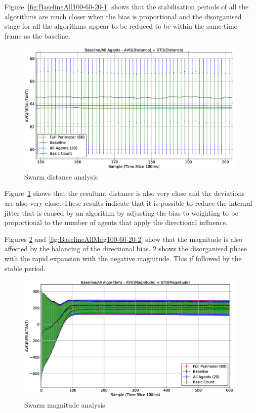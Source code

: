 Figure~\ref{fig:BaselineAll100-60-20-1} shows that the stabilisation periods of all the algorithms are much closer when the bias is proportional and the disorganised stage for all the algorithms appear to be reduced to be within the same time frame as the baseline.

\begin{figure}[H]
\begin{center}
\includegraphics[width=14cm]{CHAPTER-6/figures/BaselineAll100-60-20-2}
\end{center}
\caption{Swarm distance analysis\label{fig:BaselineAll100-60-20-2}}
\end{figure}

Figure~\ref{fig:BaselineAll100-60-20-2} shows that the resultant distance is also very close and the deviations are also very close. These results indicate that it is possible to reduce the internal jitter that is caused by an algorithm by adjusting the bias to weighting to be proportional to the number of agents that apply the directional influence.

Figures \ref{fig:BaselineAllMag100-60-20-1} and \ref{fig:BaselineAllMag100-60-20-2} show that the magnitude is also affected by the balancing of the directional bias. \ref{fig:BaselineAllMag100-60-20-1} shows the disorganised phase with the rapid expansion with the negative magnitude. This if followed by the stable period. 

\begin{figure}[H]
\begin{center}
\includegraphics[width=14cm]{CHAPTER-6/figures/BaselineAllMag100-60-20-1}
\end{center}
\caption{Swarm magnitude analysis\label{fig:BaselineAllMag100-60-20-1}}
\end{figure}

